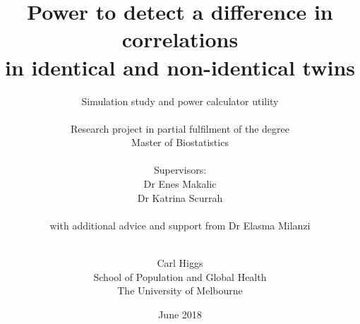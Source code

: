 \documentclass[graybox,envcountchap,sectrefs,vecarrow]{svmono}
\begin{document}

\author{Carl Higgs \\ 
		\large{School of Population and Global Health \\ 
		The University of Melbourne}}

\title{Power to detect a difference in correlations \\ 
		in identical and non-identical twins}
\subtitle{Simulation study and power calculator utility \\
		\vspace{4.5cm}
		\large{
		\\
		Research project in partial fulfilment of the degree\\
		Master of Biostatistics\\
		  \\
		Supervisors: \\
		Dr Enes Makalic \\
		Dr Katrina Scurrah \\
    \\
		with additional advice and support from Dr Elasma Milanzi 
    \\
    \\
		 }}%


\date{June 2018}

\maketitle%



\frontmatter%




\tableofcontents

\mainmatter%
\doublespacing
			





\backmatter%

\let\oldaddcontentsline\addcontentsline
\let\oldsection\section
\end{document}
